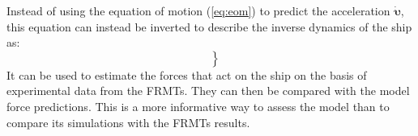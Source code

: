 \noindent Instead of using the equation of motion (\autoref{eq:eom}) to predict the acceleration $\pmb{\bm{\dot{\upsilon}}}$, this equation can instead be inverted to describe the inverse dynamics of the ship as:
\begin{equation}
    \label{eq:ID_X}
    \left.\begin{aligned}
     \\
     \\
    
    \end{aligned}\right\}
\end{equation}
%     
%     
It can be used to estimate the forces that act on the ship on the basis of experimental data from the FRMTs. They can then be compared with the model force predictions. This is a more informative way to assess the model than to compare its simulations with the FRMTs results.